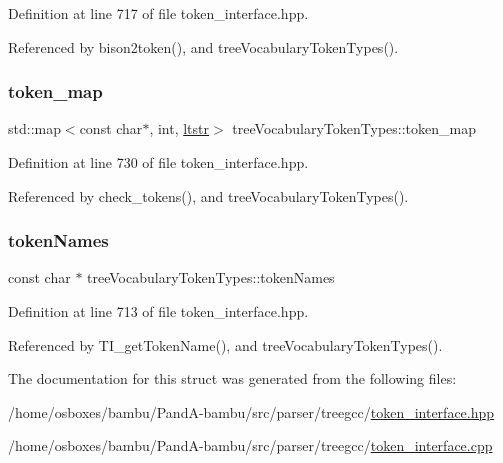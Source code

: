 Definition at line 717 of file token\+\_\+interface.\+hpp.



Referenced by bison2token(), and tree\+Vocabulary\+Token\+Types().

\mbox{\label{structtreeVocabularyTokenTypes_a2208e307304f60afa1c97b496137f1cf}} 
\subsubsection{\texorpdfstring{token\+\_\+map}{token\_map}}
{\footnotesize\ttfamily std\+::map$<$const char$\ast$, int, \hyperlink{structtreeVocabularyTokenTypes_1_1ltstr}{ltstr}$>$ tree\+Vocabulary\+Token\+Types\+::token\+\_\+map\hspace{0.3cm}{\ttfamily [private]}}



Definition at line 730 of file token\+\_\+interface.\+hpp.



Referenced by check\+\_\+tokens(), and tree\+Vocabulary\+Token\+Types().

\mbox{\label{structtreeVocabularyTokenTypes_a0a6ba025732d57a9a9b330bfeb919881}} 
\subsubsection{\texorpdfstring{token\+Names}{tokenNames}}
{\footnotesize\ttfamily const char $\ast$ tree\+Vocabulary\+Token\+Types\+::token\+Names\hspace{0.3cm}{\ttfamily [static]}}



Definition at line 713 of file token\+\_\+interface.\+hpp.



Referenced by T\+I\+\_\+get\+Token\+Name(), and tree\+Vocabulary\+Token\+Types().



The documentation for this struct was generated from the following files\+:\begin{DoxyCompactItemize}
\item 
/home/osboxes/bambu/\+Pand\+A-\/bambu/src/parser/treegcc/\hyperlink{token__interface_8hpp}{token\+\_\+interface.\+hpp}\item 
/home/osboxes/bambu/\+Pand\+A-\/bambu/src/parser/treegcc/\hyperlink{token__interface_8cpp}{token\+\_\+interface.\+cpp}\end{DoxyCompactItemize}
